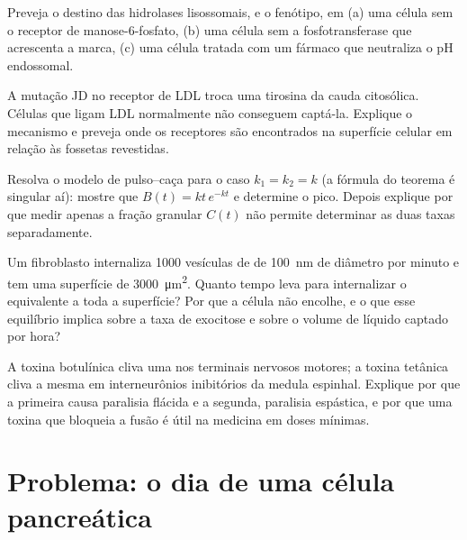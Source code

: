 \begin{exercise}[$\star\star$]\label{exo:b3:membrane-traffic:8}
Preveja o destino das hidrolases lisossomais, e o fenótipo, em (a) uma
célula sem o receptor de manose-6-fosfato, (b) uma célula sem a
fosfotransferase que acrescenta a marca, (c) uma célula tratada com um
fármaco que neutraliza o pH endossomal.
\end{exercise}

\begin{exercise}[$\star\star$]\label{exo:b3:membrane-traffic:9}
A mutação JD no receptor de LDL troca uma tirosina da cauda citosólica.
Células que ligam LDL normalmente não conseguem captá-la. Explique o
mecanismo e preveja onde os receptores são encontrados na superfície
celular em relação às fossetas revestidas.
\end{exercise}

\begin{exercise}[$\star\star\star$]\label{exo:b3:membrane-traffic:10}
Resolva o modelo de pulso--caça para o caso $k_{1} = k_{2} = k$ (a
fórmula do teorema é singular aí): mostre que $B(t) = kt\,e^{-kt}$ e
determine o pico. Depois explique por que medir apenas a fração
granular $C(t)$ não permite determinar as duas taxas separadamente.
\end{exercise}

\begin{exercise}[$\star\star\star$]\label{exo:b3:membrane-traffic:11}
Um fibroblasto internaliza \num{1000} vesículas de  de
\qty{100}{nm} de diâmetro por minuto e tem uma superfície de
\qty{3000}{\micro m^2}. Quanto tempo leva para internalizar o
equivalente a toda a superfície? Por que a célula não encolhe, e o que
esse equilíbrio implica sobre a taxa de exocitose e sobre o volume de
líquido captado por hora?
\end{exercise}

\begin{exercise}[$\star\star\star$]\label{exo:b3:membrane-traffic:12}
A toxina botulínica cliva uma  nos terminais nervosos motores; a
toxina tetânica cliva a mesma  em interneurônios inibitórios da
medula espinhal. Explique por que a primeira causa paralisia flácida e
a segunda, paralisia espástica, e por que uma toxina que bloqueia a
fusão é útil na medicina em doses mínimas.
\end{exercise}

\section{Problema: o dia de uma célula pancreática}

